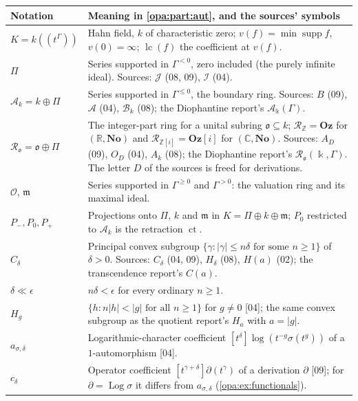 \documentclass[11pt,oneside]{article}
\numberwithin{equation}{section}
\theoremstyle{definition}
\theoremstyle{remark}
\newcommand{\No}{\mathbf{No}}
\newcommand{\Oz}{\mathbf{Oz}}
\newcommand{\Og}{\mathbf{Oz}[i]}
\newcommand{\R}{\mathbb R}
\newcommand{\C}{\mathbb C}
\newcommand{\Z}{\mathbb Z}
\newcommand{\oo}{\mathfrak o}
\newcommand{\Ak}{\mathcal A_k}
\newcommand{\Ro}{\mathcal R_{\oo}}
\newcommand{\OO}{\mathcal O}
\newcommand{\mm}{\mathfrak m}
\newcommand{\supp}{\operatorname{supp}}
\newcommand{\lc}{\operatorname{lc}}
\newcommand{\ct}{\operatorname{ct}}
\newcommand{\Log}{\operatorname{Log}}
\newcommand{\bb}{\mathbin{\ll}}
\newcommand{\Hahn}[2]{#1((t^{#2}))}
\newcommand{\coef}[2]{[t^{#1}]#2}
\newcommand{\src}[1]{\textup{\textsf{\small[#1]}}}
\begin{document}
\begin{center}
\renewcommand{\arraystretch}{1.15}
\begin{longtable}{>{\raggedright\arraybackslash}p{}>{\raggedright\arraybackslash}p{}}
\toprule
Notation & Meaning in \cref{opa:part:aut}, and the sources' symbols\\
\midrule
\endhead
$K=\Hahn k\Gamma$ & Hahn field, $k$ of characteristic zero; $v(f)=\min\supp f$,
$v(0)=\infty$; $\lc(f)$ the coefficient at $v(f)$.\\
$\Pi$ & Series supported in $\Gamma^{<0}$, zero included (the purely
infinite ideal). Sources: $\mathcal J$ (08, 09), $\mathcal I$ (04).\\
$\Ak=k\oplus\Pi$ & Series supported in $\Gamma^{\le0}$, the boundary ring.
Sources: $B$ (09), $\mathcal A$ (04), $\mathcal B_k$ (08); the Diophantine report's
$\mathcal A_\Bbbk(\Gamma)$.\\
$\Ro=\oo\oplus\Pi$ & The integer-part ring for a unital subring
$\oo\subseteq k$; $\mathcal R_\Z=\Oz$ for $(\R,\No)$ and
$\mathcal R_{\Z[i]}=\Og$ for $(\C,\No)$. Sources: $A_D$ (09), $O_D$ (04), $A_k$
(08); the Diophantine report's $\mathcal R_{\oo}(\Bbbk,\Gamma)$. The letter $D$
of the sources is freed for derivations.\\
$\OO$, $\mm$ & Series supported in $\Gamma^{\ge0}$ and $\Gamma^{>0}$: the
valuation ring and its maximal ideal.\\
$P_-,P_0,P_+$ & Projections onto $\Pi$, $k$ and $\mm$ in
$K=\Pi\oplus k\oplus\mm$; $P_0$ restricted to $\Ak$ is the retraction $\ct$.\\
$C_\delta$ & Principal convex subgroup
$\{\gamma:|\gamma|\le n\delta\text{ for some }n\ge1\}$ of $\delta>0$. Sources:
$C_\delta$ (04, 09), $H_\delta$ (08), $H(a)$ (02); the transcendence report's
$C(a)$.\\
$\delta\bb\epsilon$ & $n\delta<\epsilon$ for every ordinary $n\ge1$.\\
$H_g$ & $\{h:n|h|<|g|\text{ for all }n\ge1\}$ for $g\ne0$ \src{04}; the same
convex subgroup as the quotient report's $H_a$ with $a=|g|$.\\
$a_{\sigma,\delta}$ & Logarithmic-character coefficient
$\coef\delta{\log(t^{-g}\sigma(t^g))}$ of a $1$-automorphism \src{04}.\\
$c_\delta$ & Operator coefficient $\coef{\gamma+\delta}{\partial(t^\gamma)}$
of a derivation $\partial$ \src{09}; for $\partial=\Log\sigma$ it differs from
$a_{\sigma,\delta}$ (\cref{opa:ex:functionals}).\\

\end{longtable}
\end{center}
\end{document}
